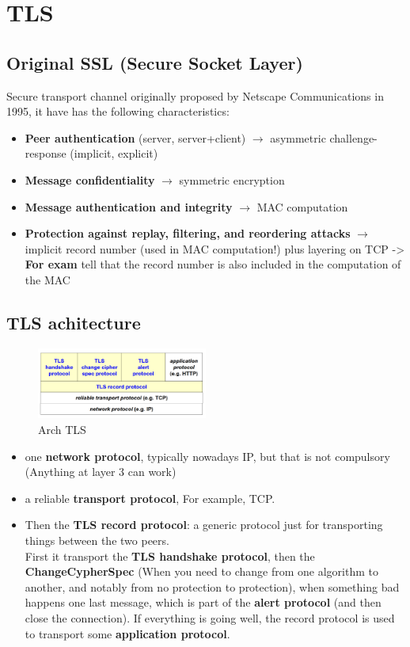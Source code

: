 \chapter{TLS}

\section{Original SSL (Secure Socket Layer)}
Secure transport channel originally proposed by Netscape Communications in 1995, it have has the following characteristics:
\begin{itemize} 
    \item \textbf{Peer authentication} (server, server+client) $\rightarrow$ asymmetric challenge-response (implicit, explicit)
    \item \textbf{Message confidentiality} $\rightarrow$ symmetric encryption
    \item \textbf{Message authentication and integrity} $\rightarrow$ MAC computation
    \item \textbf{Protection against replay, filtering, and reordering attacks} $\rightarrow$ implicit record number (used in MAC computation!) plus 
    layering on TCP -> \textbf{For exam} tell that the record number is also included in the computation of the MAC
\end{itemize}

\section{TLS achitecture}

\begin{figure}[h!]
    \centering
    \includegraphics[width=0.5\textwidth]{img/tls_arch.png}
    \caption{Arch TLS}
    \label{fig:tls_arch}
\end{figure}

\begin{itemize}
    \item one \textbf{network protocol}, typically nowadays IP, but that is not compulsory (Anything at layer 3 can work)
    \item  a reliable \textbf{transport protocol}, For example, TCP.
    \item Then the \textbf{TLS record protocol}: a generic protocol just for transporting things between the two peers. \\
            First it transport the \textbf{TLS handshake protocol}, then the \textbf{ChangeCypherSpec} (When you need to change from one algorithm to another, and notably from no protection to protection),
            when something bad happens  one last message, which is part of the \textbf{alert protocol} (and then close the connection). If everything is going well, the record protocol is used to transport some \textbf{application protocol}.

    
\end{itemize}

